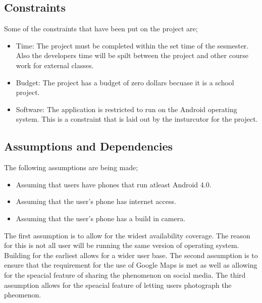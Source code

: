 \documentclass[]{article}
\begin{document}
\subsection{Constraints}

\label{sub:constraints}
Some of the constraints that have been put on the project are;
\begin{itemize}
	\item Time: The project must be completed within the set time of the sesmester. Also the developers time will be spilt between the project and other course work for external classes. 
	\item Budget: The project has a budget of zero dollars becuase it is a school project. 
	\item Software: The application is restricted to run on the Android operating system. This is a constraint that is laid out by the insturcutor for the project. 
\end{itemize}

\subsection{Assumptions and Dependencies}
\label{sub:assumptions_and_dependencies}
The following assumptions are being made;
\begin{itemize}
	\item Assuming that users have phones that run atleast Android 4.0.  
	\item Assuming that the user's phone has internet access. 
	\item Assuming that the user's phone has a build in camera. 
\end{itemize}
The first assumption is to allow for the widest availability coverage. The reason for this is not all user will be running the same version of operating system. Building for the earliest allows for a wider user base. The second assumption is to ensure that the requirement for the use of Google Maps is met as well as allowing for the speacial feature of sharing the phenomenon on social media. The third assumption allows for the speacial feature of letting users photograph the pheomenon. 

\end{document}
